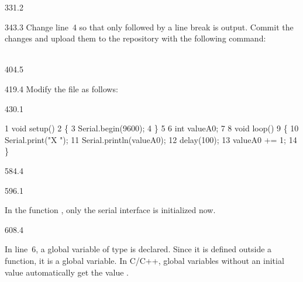\documentclass{aslab}
\makeatletter
\newcommand*\aN[1]{\textcolor{codeorange}{#1}}%
\newcommand*\aI[1]{\textcolor{codegreen}{#1}}%
\newcommand*\aK[1]{\textcolor{codered}{#1}}%
\newcommand*\aR[1]{\textcolor{codecyan}{#1}}%
\newenvironment{asmlisting}[1][11]{\par
  \edef\asm@bs{\the\baselineskip}\fontsize{#1bp}{\asm@bs}\selectfont
  \ttfamily\asm@setup}{\par}
\makeatother
\begin{document}
\begin{region}{331.2}
\end{region}

\begin{region}[pitch=12.07]{343.3}
Change line~4 so that only  followed by a line break is
output. Commit the changes and upload them to the repository with the
following command:\\
\\
\end{region}

\begin{region}{404.5}
\end{region}

\begin{region}{419.4}
Modify the file  as follows:
\end{region}

\begin{region}[pitch=10]{430.1}
\begin{asmlisting}[9]
  \aN{1} \aI{void} \aR{setup}()
  \aN{2} \{
  \aN{3}     \aR{Serial}.\aR{begin}(\aK{9600});
  \aN{4} \}
  \aN{5}
  \aN{6} \aI{int} valueA0;
  \aN{7}
  \aN{8} \aI{void} \aR{loop}()
  \aN{9} \{
 \aN{10}     \aR{Serial}.\aR{print}(\aK{"X "});
 \aN{11}     \aR{Serial}.\aR{println}(valueA0);
 \aN{12}     \aR{delay}(\aK{100});
 \aN{13}     valueA0 += \aK{1};
 \aN{14} \}
\end{asmlisting}
\end{region}

\begin{region}{584.4}
\end{region}

\begin{region}[free]{596.1}
\begin{dashlist}
\item In the function , only the serial interface is
  initialized now.
\end{dashlist}
\end{region}

\begin{region}[pitch=12.45]{608.4}
\begin{dashlist}
\item In line~6, a global variable  of type  is
  declared. Since it is defined outside a function, it is a global
  variable. In C/C++, global variables without an initial value
  automatically get the value .
\end{dashlist}
\end{region}
\end{document}
